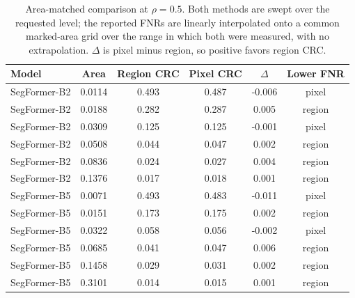 \begin{table}[t]
\centering
\caption{Area-matched comparison at $\rho=0.5$. Both methods are swept over the requested level; the reported FNRs are linearly interpolated onto a common marked-area grid over the range in which both were measured, with no extrapolation. $\Delta$ is pixel minus region, so positive favors region CRC.}
\label{tab:pareto}
\footnotesize
\setlength{\tabcolsep}{3pt}
\begin{tabular}{lccccc}
\toprule
Model & Area & Region CRC & Pixel CRC & $\Delta$ & Lower FNR \\
\midrule
SegFormer-B2 & 0.0114 & 0.493 & 0.487 & -0.006 & pixel \\
SegFormer-B2 & 0.0188 & 0.282 & 0.287 & 0.005 & region \\
SegFormer-B2 & 0.0309 & 0.125 & 0.125 & -0.001 & pixel \\
SegFormer-B2 & 0.0508 & 0.044 & 0.047 & 0.002 & region \\
SegFormer-B2 & 0.0836 & 0.024 & 0.027 & 0.004 & region \\
SegFormer-B2 & 0.1376 & 0.017 & 0.018 & 0.001 & region \\
SegFormer-B5 & 0.0071 & 0.493 & 0.483 & -0.011 & pixel \\
SegFormer-B5 & 0.0151 & 0.173 & 0.175 & 0.002 & region \\
SegFormer-B5 & 0.0322 & 0.058 & 0.056 & -0.002 & pixel \\
SegFormer-B5 & 0.0685 & 0.041 & 0.047 & 0.006 & region \\
SegFormer-B5 & 0.1458 & 0.029 & 0.031 & 0.002 & region \\
SegFormer-B5 & 0.3101 & 0.014 & 0.015 & 0.001 & region \\
\bottomrule
\end{tabular}
\end{table}
